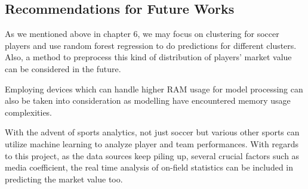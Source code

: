 \documentclass[conference]{IEEEtran}
\begin{document}
\subsection{Recommendations for Future Works}
As we mentioned above in chapter 6, we may focus on clustering for soccer players and use random forest regression to do predictions for different clusters. Also, a method to preprocess this kind of distribution of players' market value can be considered in the future.\par
Employing devices which can handle higher RAM usage for model processing can also be taken into consideration as modelling have encountered memory usage complexities.\par
With the advent of sports analytics, not just soccer but various other sports can utilize machine learning to analyze player and team performances. With regards to this project, as the data sources keep piling up, several crucial factors such as media coefficient, the real time analysis of on-field statistics can be included in predicting the market value too.


 




 
\end{document}
